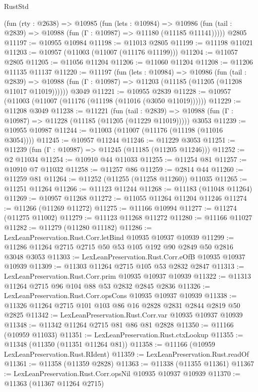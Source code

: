 \begin{lexlean}{RustStd}
\begin{coremodule}
    (fun (rty : @2638) =>
    @10985
      (fun (lets : @10984) =>
      @10986 (fun (tail : @2839) => @10988 (fun (Γ : @10987) => @11180 (@11185 @11141)))))
    @2805
@11197 := @10955 @10984
@11198 := @11013 @2805
@11199 := @11198 @11021
@11203 := @10957 (@11003 (@11007 (@11176 @11199)))
@11204 := @11057 @2805
@11205 := @11056 @11204
@11206 := @11060 @11204
@11208 := @11206 @11135 @11137
@11220 := @11197
    (fun (lets : @10984) =>
    @10986
      (fun (tail : @2839) =>
      @10988 (fun (Γ : @10987) => @11203 (@11185 (@11205 (@11208 @11017 @11019))))))
    @3049
@11221 := @10955 @2839
@11228 := @10957 (@11003 (@11007 (@11176 (@11198 (@11016 (@3050 @11019))))))
@11229 := @11208 @3049
@11238 := @11221
    (fun (tail : @2839) => @10988 (fun (Γ : @10987) => @11228 (@11185 (@11205 (@11229 @11019)))))
    @3053
@11239 := @10955 @10987
@11244 := @11003 (@11007 (@11176 (@11198 (@11016 @3054))))
@11245 := @10957 @11244
@11246 := @11229 @3053
@11251 := @11239 (fun (Γ : @10987) => @11245 (@11185 (@11205 @11246)))
@11252 := @2 @11034
@11254 := @10910 @44 @11033
@11255 := @11254 @81
@11257 := @10910 @7 @11032
@11258 := @11257 @86
@11259 := @2814 @44
@11260 := @11259 @81
@11264 := @11252 (@11255 (@11258 @11260)) @11035
@11265 := @11251 @11264
@11266 := @11123 @11244
@11268 := @11183 (@11048 @11264)
@11269 := @10957 @11268
@11272 := @11055 @11264 @11204 @11246
@11274 := @11266 (@11269 @11272)
@11275 := @11166 @10994
@11277 := @11274 (@11275 @11002)
@11279 := @11123 @11268 @11272
@11280 := @11166 @11027
@11282 := @11279 (@11280 @11182)
@11286 := LexLeanPreservation.Rust.Corr.letBind @10935 @10937 @10939
@11299 := @11286 @11264 @2715 @2715 @50 @53 @105 @192 @90 @2849 @50 @2816 @3048 @3053
@11303 := LexLeanPreservation.Rust.Corr.eOfB @10935 @10937 @10939
@11309 := @11303 @11264 @2715 @105 @53 @2832 @2847
@11313 := LexLeanPreservation.Rust.Corr.prim @10935 @10937 @10939
@11322 := @11313 @11264 @2715 @96 @104 @88 @53 @2832 @2845 @2836
@11326 := LexLeanPreservation.Rust.Corr.opsCons @10935 @10937 @10939
@11338 := @11326 @11264 @2715 @101 @103 @86 @16 @2828 @2831 @2844 @2819 @50 @2825
@11342 := LexLeanPreservation.Rust.Corr.var @10935 @10937 @10939
@11348 := @11342 @11264 @2715 @81 @86 @81 @2828
@11350 := @11166 (@10959 @11033)
@11351 := LexLeanPreservation.Rust.ctxLookup
@11355 := @11348 (@11350 (@11351 @11264 @81))
@11358 := @11166 (@10959 LexLeanPreservation.Rust.RIdent)
@11359 := LexLeanPreservation.Rust.readOf
@11361 := @11358 (@11359 @2828)
@11363 := @11338 (@11355 @11361)
@11367 := LexLeanPreservation.Rust.Corr.opsNil @10935 @10937 @10939
@11370 := @11363 (@11367 @11264 @2715)

\end{coremodule}
\end{lexlean}
